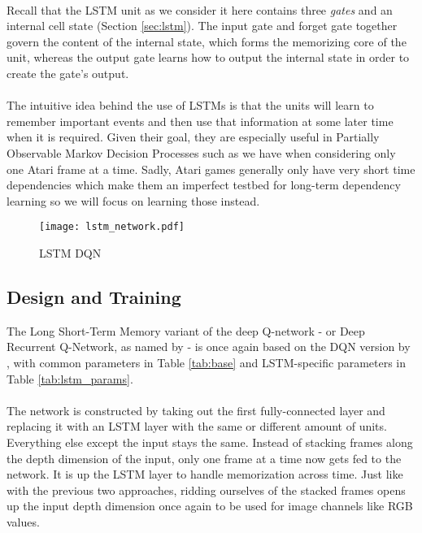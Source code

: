\paragraph{}
Recall that the LSTM unit as we consider it here
contains three \textit{gates}
and an internal cell state (Section \ref{sec:lstm}).
The input gate and forget gate together govern
the content of the internal state,
which forms the memorizing core of the unit,
whereas the output gate
learns how to output the internal state
in order to create the gate's output.

\paragraph{}
The intuitive idea behind the use of LSTMs
is that the units will learn to remember important events
and then use that information at some later time
when it is required.
Given their goal,
they are especially useful in Partially Observable Markov Decision Processes
such as we have when considering only one Atari frame at a time.
Sadly, Atari games generally only have very short time dependencies
which make them an imperfect testbed for
long-term dependency learning
so we will focus on learning those instead.

\begin{figure}[htpb]
  \centering
  \texttt{[image: lstm\_network.pdf]}
  \caption{LSTM DQN}
  \label{fig:lstm_network}
\end{figure}

\subsection{Design and Training}
\label{sub:lstm_design_and_training}
The Long Short-Term Memory variant
of the deep Q-network
- or Deep Recurrent Q-Network,
as named by \cite{Hausknecht2015} -
is once again based on the DQN version
by \cite{Mnih2013},
with common parameters in Table \ref{tab:base}
and LSTM-specific parameters in Table \ref{tab:lstm_params}.

\paragraph{}
The network is constructed by taking out
the first fully-connected layer
and replacing it with an LSTM layer
with the same or different amount of units.
Everything else except the input stays the same.
Instead of stacking frames along the depth dimension of the input,
only one frame at a time now gets fed to the network.
It is up the LSTM layer to handle memorization across time.
Just like with the previous two approaches,
ridding ourselves of the stacked frames opens up the input depth dimension
once again
to be used for image channels like RGB values.

